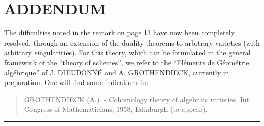 \clearpage
{}
\section*{\centering\normalfont ADDENDUM}

The difficulties noted in the remark on page 13 have now been completely
resolved, through an extension of the duality theorems to arbitrary varieties
(with arbitrary singularities). For this theory, which can be formulated in
the general framework of the “theory of schemes”, we refer to the
“Eléments de Géométrie algébrique” of J. DIEUDONNÉ and A. GROTHENDIECK,
currently in preparation. One will find some indications in:

\begin{quote}
GROTHENDIECK (A.). - Cohomology theory of algebraic varieties,
Int. Congress of Mathematicians, 1958, Edinburgh (to appear).
\end{quote}

\begin{flushright}
[April 1959]
\end{flushright}

\begin{center}\rule{36mm}{0.5pt}\end{center}

\par\smallskip
\begingroup\footnotesize
\endgroup
